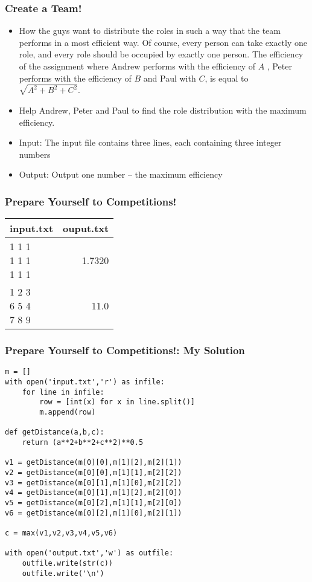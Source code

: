 \begin{frame}[fragile]\frametitle{Create a Team!}
\begin{itemize}
\item  How the guys want to distribute the roles in such a way that the team performs in a most efficient way. Of course, every person can take exactly one role, and every role should be occupied by exactly one person. The efficiency of the assignment where Andrew performs with the efficiency of $A$ , Peter performs with the efficiency of $B$ and Paul with $C$, is equal to $\sqrt{A^2 + B^2 + C^2}$.
\item Help Andrew, Peter and Paul to find the role distribution with the maximum efficiency.
\item Input: The input file contains three lines, each containing three integer numbers 
\item Output: Output one number – the maximum efficiency
\end{itemize}
\end{frame}
\begin{frame}[fragile]\frametitle{Prepare Yourself to Competitions!}

\begin{table}[h!]
    \begin{tabular}{|l|r|}
	\hline
      input.txt & ouput.txt\\
      \hline
		\makecell[l]{
		1 1 1\\
		1 1 1\\
		1 1 1} & 1.7320\\ \hline
		\makecell[l]{
		1 2 3\\
		6 5 4\\
		7 8 9} & 11.0\\		
	  \hline
    \end{tabular}
\end{table}
\end{frame}


\begin{frame}[fragile]\frametitle{Prepare Yourself to Competitions!: My Solution}
\begin{lstlisting}
m = []
with open('input.txt','r') as infile:
	for line in infile:
		row = [int(x) for x in line.split()]
		m.append(row)
		
def getDistance(a,b,c):
	return (a**2+b**2+c**2)**0.5

v1 = getDistance(m[0][0],m[1][2],m[2][1])
v2 = getDistance(m[0][0],m[1][1],m[2][2])
v3 = getDistance(m[0][1],m[1][0],m[2][2])
v4 = getDistance(m[0][1],m[1][2],m[2][0])
v5 = getDistance(m[0][2],m[1][1],m[2][0])
v6 = getDistance(m[0][2],m[1][0],m[2][1])

c = max(v1,v2,v3,v4,v5,v6)

with open('output.txt','w') as outfile:
	outfile.write(str(c))
	outfile.write('\n')
\end{lstlisting}
\end{frame}

